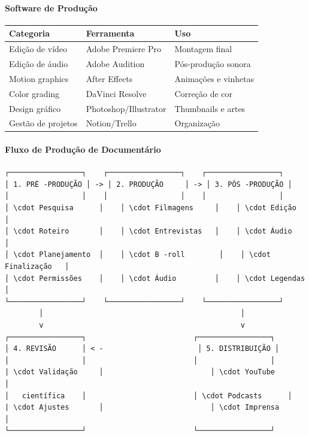 \bigskip

\paragraph{Software de Produção}

\bigskip\noindent
\begin{tabular}{p{}p{}p{}}
\toprule
Categoria & Ferramenta & Uso \\
\hline
Edição de vídeo & Adobe Premiere Pro & Montagem final \\
Edição de áudio & Adobe Audition & Pós-produção sonora \\
Motion graphics & After Effects & Animações e vinhetas \\
Color grading & DaVinci Resolve & Correção de cor \\
Design gráfico & Photoshop/Illustrator & Thumbnails e artes \\
Gestão de projetos & Notion/Trello & Organização \\
\bottomrule
\end{tabular}

\bigskip

\paragraph{Fluxo de Produção de Documentário}

\begin{verbatim}
┌─────────────────┐    ┌─────────────────┐    ┌─────────────────┐
│ 1. PRÉ -PRODUÇÃO │ -> │ 2. PRODUÇÃO     │ -> │ 3. PÓS -PRODUÇÃO │
│                 │    │                 │    │                 │
│ \cdot Pesquisa      │    │ \cdot Filmagens     │    │ \cdot Edição        │
│ \cdot Roteiro       │    │ \cdot Entrevistas   │    │ \cdot Áudio         │
│ \cdot Planejamento  │    │ \cdot B -roll        │    │ \cdot Finalização   │
│ \cdot Permissões    │    │ \cdot Áudio         │    │ \cdot Legendas      │
└─────────────────┘    └─────────────────┘    └─────────────────┘
        │                                              │
        v                                              v
┌─────────────────┐                         ┌─────────────────┐
│ 4. REVISÃO      │ < -                      │ 5. DISTRIBUIÇÃO │
│                 │                         │                 │
| \cdot Validação     │                         │ \cdot YouTube       │
│   científica    │                         │ \cdot Podcasts      │
| \cdot Ajustes       │                         │ \cdot Imprensa      │
└─────────────────┘                         └─────────────────┘
\end{verbatim}

